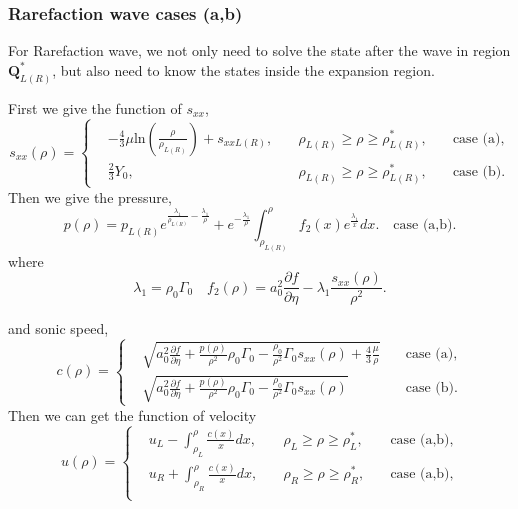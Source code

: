 \documentclass[review]{elsarticle}
\begin{document}
\subsubsection{Rarefaction  wave cases (a,b)}
For Rarefaction wave, we not only  need to solve the state after the wave in region $\mathbf{Q}_{L(R)}^*$, but also  need to know the states inside the expansion region. 

First we give the function of $s_{xx}$,
\begin{equation}
  s_{xx}(\rho) = \left\{\begin{aligned}
	  & -\frac{4}{3}\mu\text{ln}\left(\frac{\rho}{\rho_{L(R)}}\right)+s_{xxL(R)}, \quad & \rho_{L(R)} \ge \rho \ge \rho_{L(R)}^*,  \quad &\text{case (a)},\\
	  & \frac{2}{3}Y_0,  \quad & \rho_{L(R)} \ge \rho \ge \rho_{L(R)}^*,  \quad &\text{case (b)}.
  \end{aligned} \right.
  \end{equation}
Then we give the pressure,
\begin{equation}
  p(\rho)=p_{L(R)}e^{\frac{\lambda_1}{\rho_{L(R)}}-\frac{\lambda_1}{\rho}} +e^{-\frac{\lambda_1}{\rho}}\int_{\rho_{L(R)}}^{\rho} f_2(x) e^{\frac{\lambda_1}{x}}dx. \quad  \text{case (a,b)}.
\end{equation}
where 
\begin{equation}
  \lambda_1 = \rho_0 \Gamma_0 \quad f_2(\rho) = a_0^2\frac{\partial f}{\partial \eta}- \lambda_1\frac{s_{xx}(\rho)}{\rho^2}.
\end{equation}

and sonic speed,
\begin{equation}
  c(\rho) = \left\{ \begin{aligned}
	&  \sqrt{a_0^2 \frac{\partial f}{\partial \eta} + \frac{p(\rho)}{\rho^2}\rho_0\Gamma_0 -\frac{\rho_0}{\rho^2}\Gamma_0 s_{xx}(\rho) +\frac{4}{3}\frac{\mu}{\rho}} \quad & \text{case (a)},\\
	&	\sqrt{a_0^2 \frac{\partial f}{\partial \eta} + \frac{p(\rho)}{\rho^2}\rho_0\Gamma_0 -\frac{\rho_0}{\rho^2}\Gamma_0 s_{xx}(\rho)}  \quad  & \text{case (b)}.
	\end{aligned}\right.
\end{equation}
Then we can get  the  function of  velocity
\begin{equation}
  u(\rho) =\left\{ \begin{aligned} 
	  &u_L - \int_{\rho_L}^{\rho} \frac{c(x)}{x} dx, \quad  & \rho_L \ge \rho \ge \rho_L^*,   \quad &\text{case (a,b)} , \\
	  &u_R + \int_{\rho_R}^{\rho} \frac{c(x)}{x} dx, \quad  & \rho_R \ge \rho \ge \rho_R^*, \quad &\text{case (a,b)}, \\
	\end{aligned}
  \right.
\end{equation}
\end{document}
